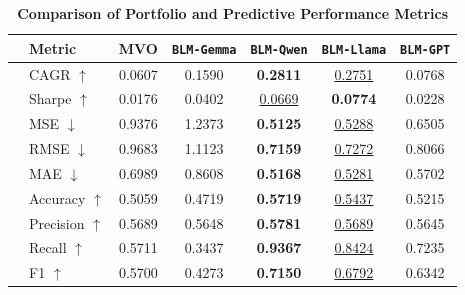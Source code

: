 \begin{table}[h!]
    \centering
    \caption{\textbf{Comparison of Portfolio and Predictive Performance Metrics}}
    \label{tab:prediction_metrics}
    \renewcommand{\arraystretch}{1.2}
    
    \small
    \setlength{\tabcolsep}{4pt} %
    
    \begin{tabular}{l l S S S S S}
    \toprule
    & \textbf{Metric} & {\textbf{MVO}} & {\textbf{\texttt{BLM-Gemma}}} & {\textbf{\texttt{BLM-Qwen}}} & {\textbf{\texttt{BLM-Llama}}} & {\textbf{\texttt{BLM-GPT}}} \\
    \midrule
    
        & CAGR \(\uparrow\)    & 0.0607 & 0.1590 & \bfseries 0.2811 & \ul{0.2751} & 0.0768 \\
        & Sharpe \(\uparrow\)  & 0.0176 & 0.0402 & \ul{0.0669} & \bfseries 0.0774 & 0.0228 \\
    \midrule
    
        & MSE $\downarrow$     & 0.9376 & 1.2373 & \bfseries 0.5125 & \ul{0.5288} & 0.6505 \\
        & RMSE $\downarrow$    & 0.9683 & 1.1123 & \bfseries 0.7159 & \ul{0.7272} & 0.8066 \\
        & MAE $\downarrow$     & 0.6989 & 0.8608 & \bfseries 0.5168 & \ul{0.5281} & 0.5702 \\
    \midrule
    
        & Accuracy $\uparrow$  & {0.5059} & 0.4719 & \bfseries 0.5719 & \ul{0.5437} & 0.5215 \\
        & Precision $\uparrow$ & {0.5689} & 0.5648 & \bfseries 0.5781 & \ul{0.5689} & 0.5645 \\
        & Recall $\uparrow$    & {0.5711} & 0.3437 & \bfseries 0.9367 & \ul{0.8424} & 0.7235 \\
        & F1 $\uparrow$        & {0.5700} & 0.4273 & \bfseries 0.7150 & \ul{0.6792} & 0.6342 \\
    \bottomrule
    \end{tabular}
\end{table}
